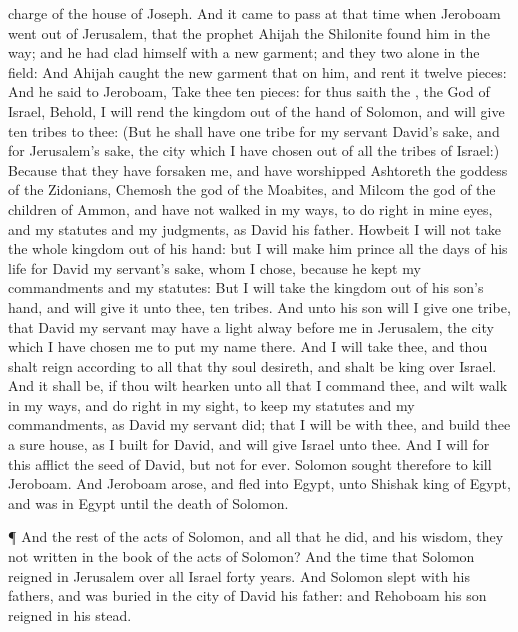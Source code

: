 {charge of the
house of
Joseph.
And it came to pass at that
time when
Jeroboam went
out of
Jerusalem, that the
prophet
Ahijah the
Shilonite
found him in the
way; and he had
clad himself with a
new
garment; and they
two
{} alone in the
field:
And
Ahijah
caught the
new
garment that
{} on him, and
rent it
{}
twelve
pieces:
And he
said to
Jeroboam,
Take thee
ten
pieces: for thus
saith the
{}, the
God of
Israel, Behold, I will
rend the
kingdom out of the
hand of
Solomon, and will
give
ten
tribes to thee:
(But he shall have
one
tribe for my
servant
David’s sake, and for
Jerusalem’s sake, the
city which I have
chosen out of all the
tribes of
Israel:)
Because that they have
forsaken me, and have
worshipped
Ashtoreth the
goddess of the
Zidonians,
Chemosh the
god of the
Moabites, and
Milcom the
god of the
children of
Ammon, and have not
walked in my
ways, to
do
{}
right in mine
eyes, and
{} my
statutes and my
judgments, as
{}
David his
father.
Howbeit I will not
take the whole
kingdom out of his
hand: but I will
make him
prince all the
days of his
life for
David my
servant’s sake, whom I
chose, because he
kept my
commandments and my
statutes:
But I will
take the
kingdom out of his
son’s
hand, and will
give it unto thee,
{}
ten
tribes.
And unto his
son will I
give
one
tribe, that
David my
servant may have a
light
alway
before me in
Jerusalem, the
city which I have
chosen me to
put my
name there.
And I will
take thee, and thou shalt
reign according to all that thy
soul
desireth, and shalt be
king over
Israel.
And it shall be, if thou wilt
hearken unto all that I
command thee, and wilt
walk in my
ways, and
do
{}
right in my
sight, to
keep my
statutes and my
commandments, as
David my
servant
did; that I will be with thee, and
build thee a
sure
house, as I
built for
David, and will
give
Israel unto thee.
And I will for this
afflict the
seed of
David, but not for
ever.
Solomon
sought therefore to
kill
Jeroboam. And
Jeroboam
arose, and
fled into
Egypt, unto
Shishak
king of
Egypt, and was in
Egypt until the
death of
Solomon.
\par }{\PP {}¶ And the
rest of the
acts of
Solomon, and all that he
did, and his
wisdom,
{} they not
written in the
book of the
acts of
Solomon?
And the
time that
Solomon
reigned in
Jerusalem over all
Israel
{}
forty
years.
And
Solomon
slept with his
fathers, and was
buried in the
city of
David his
father: and
Rehoboam his
son
reigned in his stead.

}
